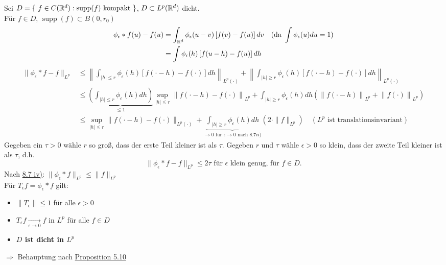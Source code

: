 \begin{beweis}
	Sei $D = \{ f \in C(\MdR^{d}): \operatorname{supp}(f) \text{ kompakt } \}$, $D \subset L^{p}(\mathbb{R}^{d})$ dicht. \\
	Für $f \in D$, $\operatorname{supp}(f) \subset B(0, r_{0})$
	\begin{align*}
		\phi_{\epsilon} \ast f(u) - f(u) & = \int_{\mathbb{R}^{d}} \phi_{\epsilon}(u - v) \left[ f(v) - f(u) \right] dv \quad (\text{da } \int \phi_{\epsilon}(u) du = 1 ) \\
		& = \int \phi_{\epsilon}(h) \left[ f(u - h) - f(u) \right] dh
	\end{align*} 
	\begin{align*}
		\| \phi_{\epsilon} \ast f - f \|_{L^{p}} & \leq \left\| \int_{|h| \leq r} \phi_{\epsilon}(h) \left[ f(\cdot - h) - f(\cdot) \right] dh \right\|_{L^{p}(\cdot)} + \left\| \int_{|h| \geq r} \phi_{\epsilon}(h) \left[ f(\cdot - h) - f(\cdot) \right] dh \right\|_{L^{p}(\cdot)} \\
		& \leq \underbrace{\left( \int_{|h| \leq r} \phi_{\epsilon}(h) dh \right)}_{\leq 1} \sup_{|h| \leq r} \left\| f(\cdot - h) - f(\cdot) \right\|_{L^{p}} + \int_{|h| \geq r} \phi_{\epsilon}(h) dh \left( \left\| f(\cdot - h) \right\|_{L^{p}} + \left\| f(\cdot) \right\|_{L^{p}} \right) \\
		& \leq \sup_{|h| \leq r} \| f( \cdot - h) - f(\cdot) \|_{L^{p}(\cdot)} + \underbrace{\int_{|h| \geq r} \phi_{\epsilon}(h) dh}_{\rightarrow 0 \text{ für } \epsilon \rightarrow 0 \text{ nach } \hyperref[bem:8.7ii]{8.7 ii)}} \left( 2 \cdot \| f \|_{L^{p}} \right) \quad  (L^{p} \text{ ist translationsinvariant})
	\end{align*}
	Gegeben ein $\tau > 0$ wähle $r$ so gro{\ss}, dass der erste Teil kleiner ist als $\tau$. Gegeben $r$ und $\tau$ wähle $\epsilon >0$ so klein, dass der zweite Teil kleiner ist als $\tau$, d.h.
	\[ \|\phi_{\epsilon} \ast f - f \|_{L^{p}} \leq 2 \tau \text{ für } \epsilon \text{ klein genug, für } f \in D. \]
	Nach \hyperref[bem:8.7iv]{8.7 iv)}: $\| \phi_{\epsilon} \ast f \|_{L^{p}} \leq \| f \|_{L^{p}}$ \\
	Für $T_{\epsilon} f = \phi_{\epsilon} \ast f$ gilt: 
	\begin{itemize}
		\item $\| T_{\epsilon} \| \leq 1$ für alle $\epsilon > 0$
		\item $T_{\epsilon} f \xrightarrow[\epsilon \rightarrow 0]{} f$ in $L^{p}$ für alle $f \in D$
		\item \textbf{$D$ ist dicht in $L^{p}$}
	\end{itemize}
	$\Rightarrow$ Behauptung nach \hyperref[prop:1-5.10]{Proposition 5.10} 
\end{beweis}


